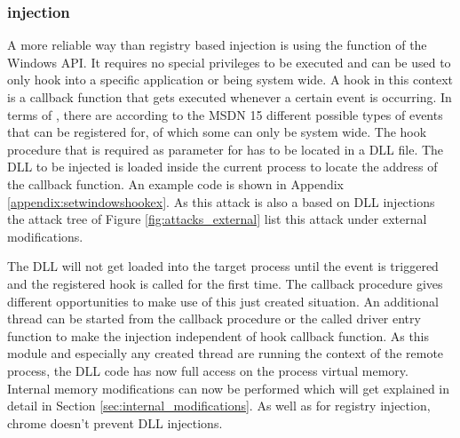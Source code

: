 \subsubsection{ injection}
A more reliable way than registry based injection is using the  function of the Windows API. It requires no special privileges to be executed and can be used to only hook into a specific application or being system wide. A hook in this context is a callback function that gets executed whenever a certain event is occurring. In terms of , there are according to the MSDN \cite{msdn_setwindowshookex} 15 different possible types of events that can be registered for, of which some can only be system wide. The hook procedure that is required as parameter for  has to be located in a DLL file. The DLL to be injected is loaded inside the current process to locate the address of the callback function. An example code is shown in Appendix \ref{appendix:setwindowshookex}. As this attack is also a based on DLL injections the attack tree of Figure \ref{fig:attacks_external} list this attack under external modifications. 

The DLL will not get loaded into the target process until the event is triggered and the registered hook is called for the first time. The callback procedure gives different opportunities to make use of this just created situation. An additional thread can be started from the callback procedure or the called driver entry function to make the injection independent of hook callback function. As this module and especially any created thread are running the context of the remote process, the DLL code has now full access on the process virtual memory. Internal memory modifications can now be performed which will get explained in detail in Section \ref{sec:internal_modifications}. As well as for registry injection, chrome doesn't prevent  DLL injections.